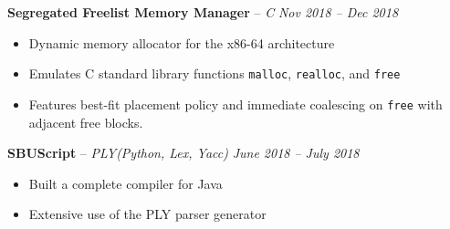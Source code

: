 \documentclass[10pt,letterpaper]{article}
\begin{document}

\headedsection
{\textbf{Segregated Freelist Memory Manager} -- \textit{C}}
{\textit{Nov 2018 -- Dec 2018}} {
	\begin{itemize}[noitemsep,nolistsep]
		\item Dynamic memory allocator for the x86-64 architecture
		\item Emulates C standard library functions \texttt{malloc}, \texttt{realloc}, and \texttt{free}
		\item Features best-fit placement policy and immediate coalescing on \texttt{free} with adjacent free blocks.
	\end{itemize}
}


\headedsection
{\textbf{SBUScript} -- \textit{PLY(Python, Lex, Yacc)}}
{\textit{June 2018 -- July 2018}} {
	\begin{itemize}[noitemsep,nolistsep]
		\item Built a complete compiler for Java
		\item Extensive use of the PLY parser generator
	\end{itemize}
}

\end{document}
